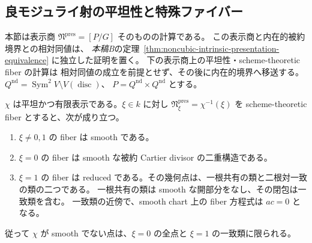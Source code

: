 \subsection{良モジュライ射の平坦性と特殊ファイバー}
\label{subsec:moduli-noncubic-fibers}

本節は表示商 $\mathfrak N^{\mathrm{pres}}=[P/G]$ そのものの計算である。
この表示商と内在的被約境界との相対同値は、
\emph{本稿B}の定理~\ref{thm:noncubic-intrinsic-presentation-equivalence}
に独立した証明を置く。
下の表示商上の平坦性・scheme-theoretic fiber の計算は
相対同値の成立を前提とせず、その後に内在的境界へ移送する。
$Q^{\mathrm{nd}}=\operatorname{Sym}^2 V\setminus V(\operatorname{disc})$、
$P=Q^{\mathrm{nd}}\times Q^{\mathrm{nd}}$ とする。
\begin{proposition}
\label{prop:moduli-noncubic-good-moduli-fibers}
$\chi$ は平坦かつ有限表示である。$\xi\in k$ に対し
$\mathfrak N^{\mathrm{pres}}_\xi=\chi^{-1}(\xi)$ を scheme-theoretic fiber とすると、次が成り立つ。
\begin{enumerate}
\item $\xi\ne0,1$ の fiber は smooth である。
\item $\xi=0$ の fiber は smooth な被約 Cartier divisor の二重構造である。
\item $\xi=1$ の fiber は reduced である。その幾何点は、一根共有の類と二根対一致の類の二つである。
一根共有の類は smooth な開部分をなし、その閉包は一致類を含む。
一致類の近傍で、smooth chart 上の fiber 方程式は $ac=0$ となる。
\end{enumerate}
従って $\chi$ が smooth でない点は、$\xi=0$ の全点と $\xi=1$ の一致類に限られる。
\end{proposition}

